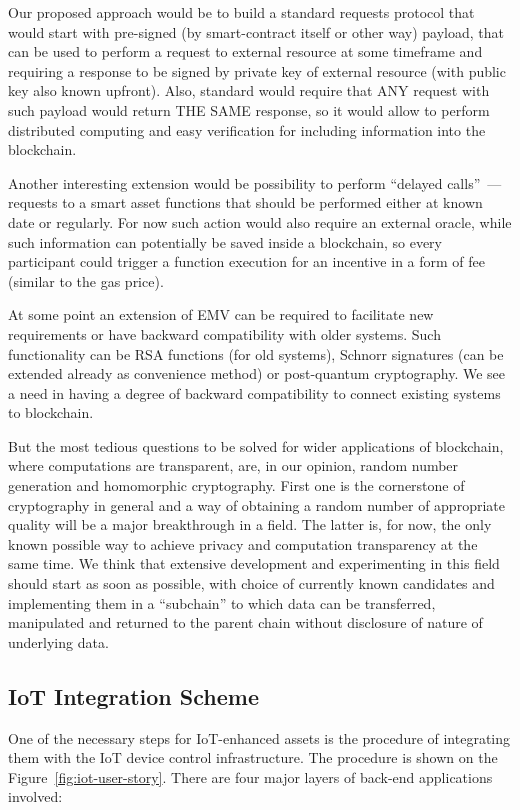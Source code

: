 \documentclass{article}
\begin{document}
\begin{multicols}{2}
Our proposed approach would be to build a standard requests protocol that would start with pre-signed (by smart-contract itself or other way) payload, that can be used to perform a request to external resource at some timeframe and requiring a response to be signed by private key of external resource (with public key also known upfront). Also, standard would require that ANY request with such payload would return THE SAME response, so it would allow to perform distributed computing and easy verification for including information into the blockchain.

Another interesting extension would be possibility to perform \enquote{delayed calls}~--- requests to a smart asset functions that should be performed either at known date or regularly. For now such action would also require an external oracle, while such information can potentially be saved inside a blockchain, so every participant could trigger a function execution for an incentive in a form of fee (similar to the gas price).

At some point an extension of EMV can be required to facilitate new requirements or have backward compatibility with older systems. Such functionality can be RSA functions (for old systems), Schnorr signatures (can be extended already as convenience method) or post-quantum cryptography. We see a need in having a degree of backward compatibility to connect existing systems to blockchain.

But the most tedious questions to be solved for wider applications of blockchain, where computations are transparent, are, in our opinion, random number generation and homomorphic cryptography. First one is the cornerstone of cryptography in general and a way of obtaining a random number of appropriate quality will be a major breakthrough in a field. The latter is, for now, the only known possible way to achieve privacy and computation transparency at the same time. We think that extensive development and experimenting in this field should start as soon as possible, with choice of currently known candidates and implementing them in a \enquote{subchain} to which data can be transferred, manipulated and returned to the parent chain without disclosure of nature of underlying data.

\subsection{IoT Integration Scheme}

One of the necessary steps for IoT-enhanced assets is the procedure of integrating them with the IoT device control infrastructure. The procedure is shown on the Figure~\ref{fig:iot-user-story}.
There are four major layers of back-end applications involved:


\end{multicols}
\end{document}
